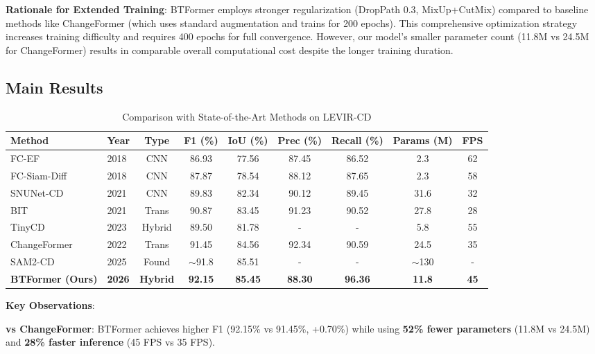 \documentclass[journal]{IEEEtran}
\begin{document}
\textbf{Rationale for Extended Training}: BTFormer employs stronger regularization (DropPath 0.3, MixUp+CutMix) compared to baseline methods like ChangeFormer (which uses standard augmentation and trains for 200 epochs). This comprehensive optimization strategy increases training difficulty and requires 400 epochs for full convergence. However, our model's smaller parameter count (11.8M vs 24.5M for ChangeFormer) results in comparable overall computational cost despite the longer training duration.

\subsection{Main Results}

\begin{table}[t]
\centering
\caption{Comparison with State-of-the-Art Methods on LEVIR-CD}
\label{tab:main_results}
\begin{tabular}{llccccccc}
\toprule
\textbf{Method} & \textbf{Year} & \textbf{Type} & \textbf{F1 (\%)} & \textbf{IoU (\%)} & \textbf{Prec (\%)} & \textbf{Recall (\%)} & \textbf{Params (M)} & \textbf{FPS} \\
\midrule
FC-EF~\cite{daudt2018fully} & 2018 & CNN & 86.93 & 77.56 & 87.45 & 86.52 & 2.3 & 62 \\
FC-Siam-Diff~\cite{daudt2018fully} & 2018 & CNN & 87.87 & 78.54 & 88.12 & 87.65 & 2.3 & 58 \\
SNUNet-CD~\cite{chen2021snunet} & 2021 & CNN & 89.83 & 82.34 & 90.12 & 89.45 & 31.6 & 32 \\
BIT~\cite{chen2021remote} & 2021 & Trans & 90.87 & 83.45 & 91.23 & 90.52 & 27.8 & 28 \\
TinyCD~\cite{codegoni2023tinycd} & 2023 & Hybrid & 89.50 & 81.78 & - & - & 5.8 & 55 \\
ChangeFormer~\cite{bandara2022transformer} & 2022 & Trans & 91.45 & 84.56 & 92.34 & 90.59 & 24.5 & 35 \\
SAM2-CD~\cite{qin2025sam2} & 2025 & Found & $\sim$91.8 & 85.51 & - & - & $\sim$130 & - \\
\midrule
\textbf{BTFormer (Ours)} & \textbf{2026} & \textbf{Hybrid} & \textbf{92.15} & \textbf{85.45} & \textbf{88.30} & \textbf{96.36} & \textbf{11.8} & \textbf{45} \\
\bottomrule
\end{tabular}
\end{table}

\textbf{Key Observations}:

\textbf{vs ChangeFormer}: BTFormer achieves higher F1 (92.15\% vs 91.45\%, +0.70\%) while using \textbf{52\% fewer parameters} (11.8M vs 24.5M) and \textbf{28\% faster inference} (45 FPS vs 35 FPS).
\end{document}
